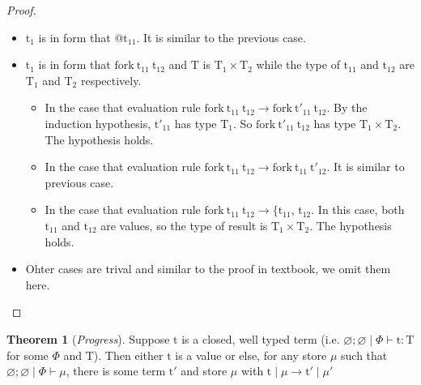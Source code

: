 \documentclass[10pt]{article}
\newcommand{\lto}{\longrightarrow}
\let\emptyset\varnothing
\theoremstyle{definition}\newtheorem*{theorem}{Theorem}
\theoremstyle{definition}\newtheorem*{definition}{Definition}
\theoremstyle{definition}\newtheorem*{lemma}{Lemma}
\begin{document}
\begin{proof}
\begin{itemize}
\begin{itemize}
                    \end{itemize}
                \item $\mathrm{t_1}$ is in form that $@\mathrm{t_{11}}$. It is similar to the previous case.
                \item $\mathrm{t_1}$ is in form that $\mathrm{fork}\ \mathrm{t_{11}}\ \mathrm{t_{12}}$ and $\mathrm{T}$ is $\mathrm{T_1}\times\mathrm{T_2}$ while the type of $\mathrm{t_{11}}$ and $\mathrm{t_{12}}$ are $\mathrm{T_1}$ and $\mathrm{T_2}$ respectively.
                    \begin{itemize}
                        \item In the case that evaluation rule $\mathrm{fork}\ \mathrm{t_{11}}\ \mathrm{t_{12}} \lto \mathrm{fork}\ \mathrm{t'_{11}}\ \mathrm{t_{12}}$. By the induction hypothesis, $\mathrm{t'_{11}}$ has type $\mathrm{T_1}$. So $\mathrm{fork}\ \mathrm{t'_{11}}\ \mathrm{t_{12}}$ has type $\mathrm{T_1}\times\mathrm{T_2}$.
                            The hypothesis holds.
                        \item In the case that evaluation rule $\mathrm{fork}\ \mathrm{t_{11}}\ \mathrm{t_{12}} \lto \mathrm{fork}\ \mathrm{t_{11}}\ \mathrm{t'_{12}}$. It is similar to previous case.
                        \item In the case that evaluation rule $\mathrm{fork}\ \mathrm{t_{11}}\ \mathrm{t_{12}} \lto \{\mathrm{t_{11}},\,\mathrm{t_{12}}$. In this case, both $\mathrm{t_{11}}$ and $\mathrm{t_{12}}$ are values, so the type of result is $\mathrm{T_1}\times\mathrm{T_2}$. The hypothesis holds.
                    \end{itemize}
                \item Ohter cases are trival and similar to the proof in textbook, we omit them here.
        \end{itemize}
    \end{proof}
    \begin{theorem}[{\it Progress}]
        Suppose $\mathrm{t}$ is a closed, well typed term 
        (i.e. $\emptyset;\emptyset\mid\Phi\vdash\mathrm{t}\colon\mathrm{T}$ for some $\Phi$ and $\mathrm{T}$). 
        Then either $\mathrm{t}$ is a value or else, for any store $\mu$ such that $\emptyset;\emptyset\mid\Phi\vdash\mu$, 
        there is some term $\mathrm{t'}$ and store $\mu$ with $\mathrm{t}\mid\mu\lto\mathrm{t'}\mid\mu'$
    \end{theorem}
\end{document}
